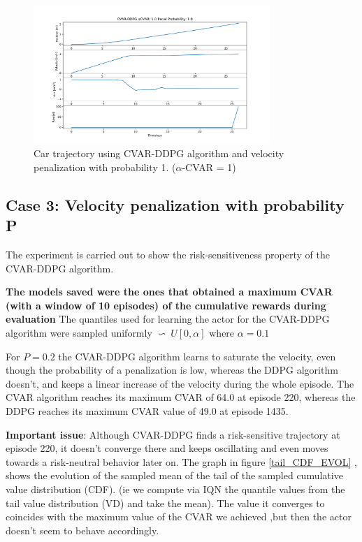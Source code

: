 \begin{figure}[ht]
        \centering
        \includegraphics[width=0.8\textwidth]{images/Car/CVAR/Trajectory_CVAR_ppenal1.pdf}
        \caption{Car trajectory using CVAR-DDPG algorithm and velocity penalization with probability 1. ($\alpha$-CVAR = 1)}
        \label{traj_cvarddpg_probpenal1_cvar1}
    
\end{figure}

\newpage
\subsection{Case 3: Velocity penalization with probability P }
The experiment is carried out to show the risk-sensitiveness property of the CVAR-DDPG algorithm.

\textbf{The models saved were the ones that obtained a maximum CVAR (with a window of 
10 episodes) of the cumulative rewards during evaluation}
The quantiles used for learning the actor for the CVAR-DDPG algorithm were sampled
uniformly $\backsim\ U[0,\alpha] $ where $\alpha=0.1$

For $P=0.2$ the CVAR-DDPG algorithm learns to saturate the velocity, even though the
probability of a penalization is low, whereas the DDPG algorithm doesn't, and keeps a
linear increase of the velocity during the whole episode.
The CVAR algorithm reaches its maximum CVAR of 64.0 at episode 220, whereas the DDPG
reaches its maximum CVAR value of 49.0 at episode 1435.

\textbf{Important issue}: Although CVAR-DDPG finds a risk-sensitive trajectory at
episode 220, it doesn't converge there and keeps oscillating and even moves towards a
risk-neutral behavior later on.
The graph in figure \ref{tail_CDF_EVOL} , shows the evolution of the sampled mean of the
tail of the sampled cumulative value distribution (CDF). (ie we compute via IQN the
quantile values from the tail value distribution (VD) and take the mean).
The value it converges to coincides with the maximum value of the CVAR we achieved ,but
then the actor doesn't seem to behave accordingly.


